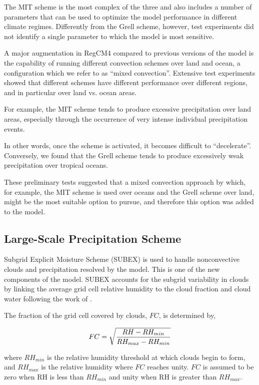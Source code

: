 {\begin{enumerate}
The MIT scheme is the most complex of the three and also includes a number of
parameters that can be used to optimize the model performance in different
climate regimes. Differently from the Grell scheme, however, test experiments
did not identify a single parameter to which the model is most sensitive.
\end{enumerate}


A major augmentation in \ac{RegCM4} compared to previous versions of the model
is the capability of running different convection schemes over land and ocean,
a configuration which we refer to as “mixed convection”. Extensive test
experiments showed that different schemes have different performance over
different regions, and in particular over land vs. ocean areas.

For example, the MIT scheme tends to produce excessive precipitation over land
areas, especially through the occurrence of very intense individual
precipitation events.

In other words, once the scheme is activated, it becomes difficult to
“decelerate”. Conversely, we found that the Grell scheme tends to produce
excessively weak precipitation over tropical oceans.

These preliminary tests suggested that a mixed convection approach by which,
for example, the MIT scheme is used over oceans and the Grell scheme over
land, might be the most suitable option to pursue, and therefore this option
was added to the model.

\subsection{Large-Scale Precipitation Scheme}

Subgrid Explicit Moisture
Scheme (SUBEX) is used to handle nonconvective clouds and precipitation resolved
by the model.  This is one of the new components of the model.  SUBEX accounts
for the subgrid variability in clouds by linking the average grid cell relative
humidity to the cloud fraction and cloud water following the work of
\cite{Sundqvist_89}.  

The fraction of the grid cell covered by clouds, $FC$, is determined by,

\begin{eqnarray}
FC = \sqrt{ { {RH - RH_{min}} \over {RH_{max} - RH_{min} }} }
\end{eqnarray}

where ${RH_{min}}$ is the relative humidity threshold at which clouds
begin to form, and ${RH_{max}}$ is the relative humidity where $FC$ reaches
unity.  $FC$ is assumed to be zero when RH is less than ${RH_{min}}$ and unity
when RH is greater than ${RH_{max}}$.  

}
